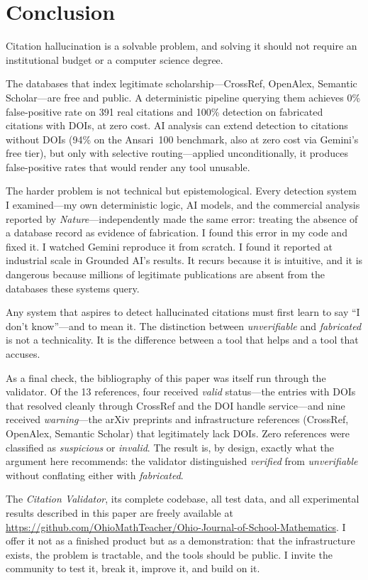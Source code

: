 \section{Conclusion}

Citation hallucination is a solvable problem, and solving it should not require an institutional budget or a computer science degree.

The databases that index legitimate scholarship---CrossRef, OpenAlex, Semantic Scholar---are free and public. A deterministic pipeline querying them achieves 0\% false-positive rate on 391 real citations and 100\% detection on fabricated citations with DOIs, at zero cost. AI analysis can extend detection to citations without DOIs (94\% on the Ansari~100 benchmark, also at zero cost via Gemini's free tier), but only with selective routing---applied unconditionally, it produces false-positive rates that would render any tool unusable.

The harder problem is not technical but epistemological. Every detection system I examined---my own deterministic logic, AI models, and the commercial analysis reported by \textit{Nature}---independently made the same error: treating the absence of a database record as evidence of fabrication. I found this error in my code and fixed it. I watched Gemini reproduce it from scratch. I found it reported at industrial scale in Grounded AI's results. It recurs because it is intuitive, and it is dangerous because millions of legitimate publications are absent from the databases these systems query.

Any system that aspires to detect hallucinated citations must first learn to say ``I don't know''---and to mean it. The distinction between \emph{unverifiable} and \emph{fabricated} is not a technicality. It is the difference between a tool that helps and a tool that accuses.

As a final check, the bibliography of this paper was itself run through the validator. Of the 13 references, four received \textit{valid} status---the entries with DOIs that resolved cleanly through CrossRef and the DOI handle service---and nine received \textit{warning}---the arXiv preprints and infrastructure references (CrossRef, OpenAlex, Semantic Scholar) that legitimately lack DOIs. Zero references were classified as \textit{suspicious} or \textit{invalid}. The result is, by design, exactly what the argument here recommends: the validator distinguished \emph{verified} from \emph{unverifiable} without conflating either with \emph{fabricated}.

The \emph{Citation Validator}, its complete codebase, all test data, and all experimental results described in this paper are freely available at \url{https://github.com/OhioMathTeacher/Ohio-Journal-of-School-Mathematics}. I offer it not as a finished product but as a demonstration: that the infrastructure exists, the problem is tractable, and the tools should be public. I invite the community to test it, break it, improve it, and build on it.
